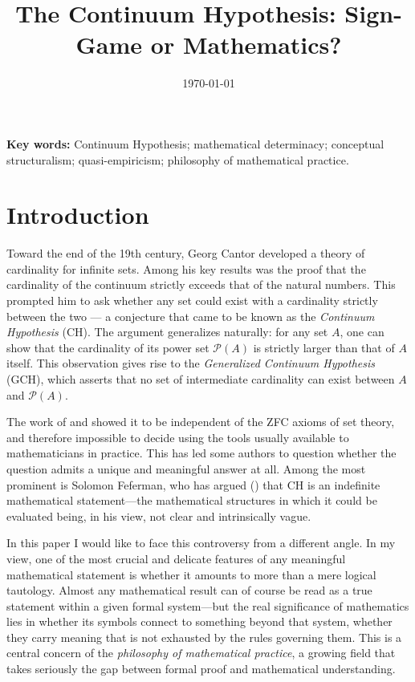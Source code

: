 \documentclass[11pt,a4paper]{article}
\title{\textbf{The Continuum Hypothesis: Sign-Game or Mathematics?}}
\author{}
\date{\today}
\begin{document}
\maketitle

\begin{abstract}


\end{abstract}

\noindent\textbf{Key words:} Continuum Hypothesis; mathematical determinacy; conceptual structuralism; quasi-empiricism; philosophy of mathematical practice.

\section{Introduction}
\label{Intro}

Toward the end of the 19th century, Georg Cantor developed a theory of cardinality for infinite sets. Among his key results was the proof that the cardinality of the continuum strictly exceeds that of the natural numbers. This prompted him to ask whether any set could exist with a cardinality strictly between the two --- a conjecture that came to be known as the \textit{Continuum Hypothesis} (CH). The argument generalizes naturally: for any set $A$, one can show that the cardinality of its power set $\mathcal{P}(A)$ is strictly larger than that of $A$ itself. This observation gives rise to the \textit{Generalized Continuum Hypothesis} (GCH), which asserts that no set of intermediate cardinality can exist between $A$ and $\mathcal{P}(A)$. 

The work of \textcite{Godel1940} and \textcite{Cohen1966} showed it to be independent of the ZFC axioms of set theory, and therefore impossible to decide using the tools usually available to mathematicians in practice. This has led some authors to question whether the question admits a unique and meaningful answer at all. Among the most prominent is Solomon Feferman, who has argued (\citeyear{Feferman2011a}) that $\mathrm{CH}$ is an indefinite mathematical statement---the mathematical structures in which it could be evaluated being, in his view, not clear and intrinsically vague.

In this paper I would like to face this controversy from a different angle. In my view, one of the most crucial and delicate features of any meaningful mathematical statement is whether it amounts to more than a mere logical tautology. Almost any mathematical result can of course be read as a true statement within a given formal system---but the real significance of mathematics lies in whether its symbols connect to something beyond that system, whether they carry meaning that is not exhausted by the rules governing them. This is a central concern of the \textit{philosophy of mathematical practice}, a growing field that takes seriously the gap between formal proof and mathematical understanding. 
\end{document}
